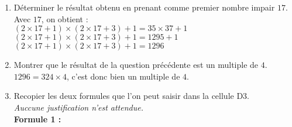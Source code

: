 \begin{corrige}
\begin{enumerate}
        \smallskip
        \scalebox{0.6}{
        \begin{Tableur}[Bandeau=false,Colonnes=5,Largeur=80pt]
            &Nombre impair&Nombre impair suivant&Produit&Résultat obtenu\\
            $x$&$2x+1$&$2x+3$&$(2x+1)(2x+3)$&$(2x+1)(2x+3)+1$\\
            $0$&$1$&$3$&$3$&$4$\\
            $1$&$3$&$5$&$15$&$16$\\
            $2$&$5$&$7$&$35$&$36$\\
            $3$&$7$&$9$&$63$&$64$\\
            $4$&$9 $&$11$&$99 $&$100$\\
            $5$&$11$&$13$&$143$&$144$\\
            $6$&$13$&$15$&$195$&$196$\\
            $7$&$15$&$17$&$255$&$256$\\
            $8$&$17$&$19$&$323$&$324$\\
            $9$&$19$&$21$&$399$&$400$\\
        \end{Tableur}       
        }
        \smallskip
        \begin{enumerate}
            \item Déterminer le résultat obtenu en prenant comme premier nombre impair $17$.\\
            {\red Avec $17$, on obtient : \\
            $(2\times 17 + 1)\times (2\times 17 + 3)+1=35\times 37+1$\\
            $(2\times 17 + 1)\times (2\times 17 + 3)+1=\num{1295}+1$\\
            $(2\times 17 + 1)\times (2\times 17 + 3)+1=\num{1296}$\\
            }
            \item Montrer que le résultat de la question précédente est un multiple de $4$.\\
            {\red $\num{1296}=324\times 4$, c'est donc bien un multiple de $4$.}\\
            \item Recopier les deux formules que l'on peut saisir dans la cellule D3.\\
            \textit{Auccune justification n'est attendue.}\\            
            {\bfseries Formule 1 : } \\

\end{enumerate}
\end{enumerate}
\end{corrige}

